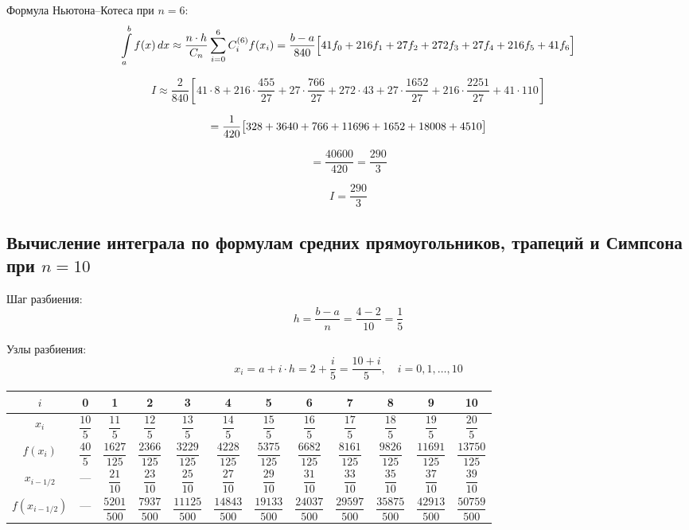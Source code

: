 Формула Ньютона--Котеса при $n = 6$:
\[
\int\limits_a^b f(x)\,dx \approx \frac{n \cdot h}{C_n}\sum_{i=0}^{6} C_i^{(6)} f(x_i) = \frac{b-a}{840}\Bigl[41f_0 + 216f_1 + 27f_2 + 272f_3 + 27f_4 + 216f_5 + 41f_6\Bigr]
\]

\[
I \approx \frac{2}{840}\left[41\cdot 8 + 216\cdot\frac{455}{27} + 27\cdot\frac{766}{27} + 272\cdot 43 + 27\cdot\frac{1652}{27} + 216\cdot\frac{2251}{27} + 41\cdot 110\right] 
\]

\[
= \frac{1}{420}\bigl[328 + 3640 + 766 + 11696 + 1652 + 18008 + 4510\bigr] \\
\]

\[
= \frac{40600}{420} = \frac{290}{3}
\]

\[
\boxed{I = \frac{290}{3}}
\]

\subsection{Вычисление интеграла по формулам средних прямоугольников, трапеций и Симпсона при $n = 10$}

Шаг разбиения:
\[
h = \frac{b-a}{n} = \frac{4-2}{10} = \frac{1}{5}
\]

Узлы разбиения:
\[
x_i = a + i\cdot h = 2 + \frac{i}{5} = \frac{10+i}{5},\quad i = 0,1,\ldots,10
\]

\begin{table}[h!]
\centering
\label{tab:values}
\renewcommand{\arraystretch}{2.25}
\begin{tabular}{|c|c|c|c|c|c|c|c|c|c|c|c|}
\hline
$i$ & 0 & 1 & 2 & 3 & 4 & 5 & 6 & 7 & 8 & 9 & 10 \\
\hline
$x_i$ & $\dfrac{10}{5}$ & $\dfrac{11}{5}$ & $\dfrac{12}{5}$ & $\dfrac{13}{5}$ & $\dfrac{14}{5}$ & $\dfrac{15}{5}$ & $\dfrac{16}{5}$ & $\dfrac{17}{5}$ & $\dfrac{18}{5}$ & $\dfrac{19}{5}$ & $\dfrac{20}{5}$ \\
\hline
$f(x_i)$ & $\dfrac{40}{5}$ & $\dfrac{1627}{125}$ & $\dfrac{2366}{125}$ & $\dfrac{3229}{125}$ & $\dfrac{4228}{125}$ & $\dfrac{5375}{125}$ & $\dfrac{6682}{125}$ & $\dfrac{8161}{125}$ & $\dfrac{9826}{125}$ & $\dfrac{11691}{125}$ & $\dfrac{13750}{125}$ \\
\hline
$x_{i-1/2}$ & --- & $\dfrac{21}{10}$ & $\dfrac{23}{10}$ & $\dfrac{25}{10}$ & $\dfrac{27}{10}$ & $\dfrac{29}{10}$ & $\dfrac{31}{10}$ & $\dfrac{33}{10}$ & $\dfrac{35}{10}$ & $\dfrac{37}{10}$ & $\dfrac{39}{10}$ \\
\hline
$f(x_{i-1/2})$ & --- & $\dfrac{5201}{500}$ & $\dfrac{7937}{500}$ & $\dfrac{11125}{500}$ & $\dfrac{14843}{500}$ & $\dfrac{19133}{500}$ & $\dfrac{24037}{500}$ & $\dfrac{29597}{500}$ & $\dfrac{35875}{500}$ & $\dfrac{42913}{500}$ & $\dfrac{50759}{500}$ \\
\hline
\end{tabular}
\end{table}

